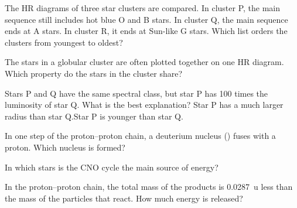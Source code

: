 \begin{quizq}{}
The HR diagrams of three star clusters are compared. In cluster P, the main sequence still includes
hot blue O and B stars. In cluster Q, the main sequence ends at A stars. In cluster R, it ends at
Sun-like G stars. Which list orders the clusters from youngest to oldest?
\end{quizq}

\begin{quizq}{}
The stars in a globular cluster are often plotted together on one HR diagram. Which property do the
stars in the cluster share?
\end{quizq}

\begin{quizq}{}
Stars P and Q have the same spectral class, but star P has 100 times the luminosity of star Q. What is
the best explanation?
  {Star P has a much larger radius than star Q.}{Star P is younger than star Q.}
\end{quizq}

\begin{quizq}{}
In one step of the proton--proton chain, a deuterium nucleus () fuses with a proton. Which
nucleus is formed?
\end{quizq}

\begin{quizq}{}
In which stars is the CNO cycle the main source of energy?
\end{quizq}

\begin{quizq}{}
In the proton--proton chain, the total mass of the products is \qty{0.0287}{u} less than the mass of
the particles that react. How much energy is released?
\end{quizq}

